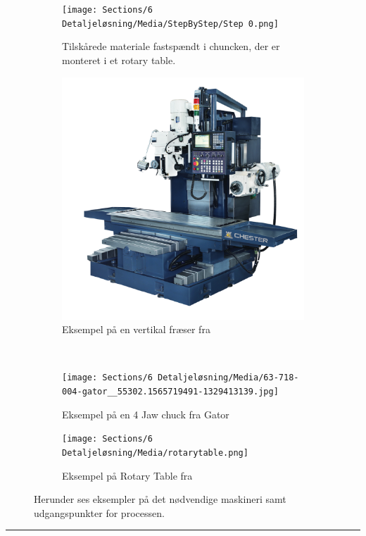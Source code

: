 \begin{figure}[H]
    \begin{subfigure}[b]{0.48\textwidth}
        \centering
        \texttt{[image: Sections/6 Detaljeløsning/Media/StepByStep/Step 0.png]}
        \caption{Tilskårede materiale fastspændt i chuncken, der er monteret i et rotary table.}
        \label{fig:Step0}
    \end{subfigure}
    \hfill
    \begin{subfigure}[b]{0.48\textwidth}
        \centering
        \includegraphics[width=0.8\linewidth]{Sections/6 Detaljeløsning/Media/Vertical-Horizontal-Bed-Type-CNC-Milling-Machine-•-Chester-•-GM1500VS-3222663431.png}
        \caption{Eksempel på en vertikal fræser fra \parencite{CHESTER2025GM1500VSTools}}
        \label{fig:VerticalMill}
    \end{subfigure}
    \\
    \begin{subfigure}[b]{0.48\textwidth}
        \centering
        \texttt{[image: Sections/6 Detaljeløsning/Media/63-718-004-gator\_\_55302.1565719491-1329413139.jpg]}
        \caption{Eksempel på en 4 Jaw chuck fra Gator \parencite{PennToolCo.2025GatorInc}}
        \label{fig:Chuck}
    \end{subfigure}
    \hfill
    \begin{subfigure}[b]{0.48\textwidth}
        \centering
        \texttt{[image: Sections/6 Detaljeløsning/Media/rotarytable.png]}
        \caption{Eksempel på Rotary Table fra \parencite{Haas2025RotaryTables}}
        \label{fig:RotTable}
    \end{subfigure}
\caption{Herunder ses eksempler på det nødvendige maskineri samt udgangspunkter for processen.}
\end{figure} \plainbreak{-.5}

